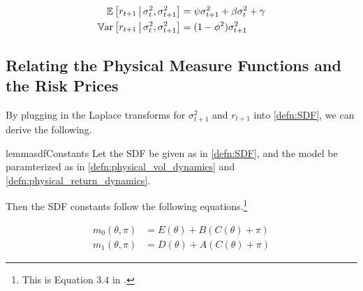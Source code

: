 \documentclass[11pt, letterpaper, twoside, final]{article}
\begin{document}
\begin{align}
    \label{eqn:rtn_cond_mean}
    \operatorname{\mathbb{E}}\left[r_{t+1} \,\middle\vert\, \sigma^2_t, \sigma^2_{t+1}\right]  &= \psi \sigma^2_{t+1}  + \beta \sigma^2_t +
    \gamma \\
    \label{eqn:rtn_cond_vol}
    \operatorname{\mathbb{V}ar}\left[r_{t+1} \,\middle\vert\, \sigma^2_t, \sigma^2_{t+1}\right]  &= (1 - \phi^2) \sigma^2_{t+1}  
\end{align}



\subsection{Relating the Physical Measure Functions and the Risk Prices}

By plugging in the Laplace transforms for $\sigma^2_{t+1}$ and $r_{t+1}$ into \cref{defn:SDF}, we can derive the
following.

\begin{restatable}{lemma}{sdfConstants}
    \label{lemma:characterizing_sdf_integration_constants}
    Let the SDF be given as in \cref{defn:SDF}, and the model be paramterized as in
    \cref{defn:physical_vol_dynamics} and \cref{defn:physical_return_dynamics}.

    Then the SDF constants follow the following equations.\footnote{This is Equation $3.4$ in
    \textcite[3.4]{khrapov2016affine}.}

    \begin{align}
        \label{eqn:sdf_functions_vs_physical_functions}
        m_0(\theta, \pi)  &= E(\theta) + B(C(\theta) + \pi) \\
        m_1(\theta, \pi)  &= D(\theta) + A(C(\theta) + \pi) \nonumber
    \end{align}

\end{restatable}


\end{document}
